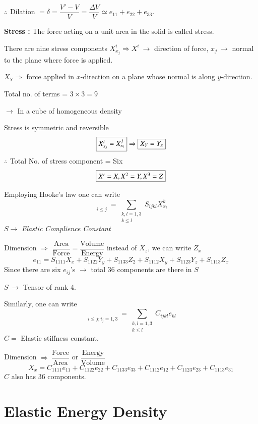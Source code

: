 $\therefore$ Dilation $=\delta=\dfrac{V'-V}{V}=\dfrac{\Delta V}{V}\simeq e_{11}+e_{22}+e_{33}$.

\eject

\noindent
{\bf Stress :} The force acting on a unit area in the solid is called stress.

There are nine stress components $X^{i}_{x_{j}}\Rightarrow X^{i} \ \to$ direction of force, $x_{j} \ \to$ normal to the plane where force is applied.

$X_{Y}\Rightarrow$ force applied in $x$-direction on a plane whose normal is along $y$-direction.

Total no. of terms = $3\times 3=9$

$\to$ In a cube of homogeneous density

Stress is symmetric and reversible
$$
\fbox{$X^{i}_{x_{j}}=X^{j}_{x_{i}}$}\Rightarrow \fbox{$X_{Y}=Y_{x}$}
$$
$\therefore$ Total No. of stress component = Six
$$
\fbox{$X'=X, X^{2}=Y, X^{3}=Z$}
$$

Employing Hooke's law one can write
$$
{\displaystyle{\mathop{e_{ij}}\limits_{i\leq j}}}=\sum\limits_{\substack{k,l=1,3\\ k\leq l}}S_{ijkl}X^{k}_{x_{l}}
$$
$S\to$ {\em Elastic Complience Constant}

Dimension $\Rightarrow$ $\dfrac{\text{Area}}{\text{Force}}=\dfrac{\text{Volume}}{\text{Energy}}$ instead of $X_{z}$, we can write $Z_{x}$
$$
e_{11}=S_{1111}X_{x}+S_{1122}Y_{y}+S_{1133}Z_{2}+S_{1112}X_{y}+S_{1123}Y_{z}+S_{1113}Z_{x}
$$
Since there are six $e_{ij}$'s $\to$ total 36 components are there in $S$

$S \ \to$ Tensor of rank 4.

Similarly, one can write
$$
{\displaystyle{\mathop{X^{i}_{x_{j}}}\limits_{i\leq j; i_{j}=1,3}}}=\sum\limits_{\substack{k,l=1,3\\ k\leq l}}C_{ijkl}e_{kl}
$$
$C=$ Elastic stiffness constant.

\medskip

Dimension $\Rightarrow \ \dfrac{\text{Force}}{\text{Area}}$ or $\dfrac{\text{Energy}}{\text{Volume}}$
$$
X_{x}=C_{1111}e_{11}+C_{1122}e_{22}+C_{1133}e_{33}+C_{1112}e_{12}+C_{1123}e_{23}+C_{1113}e_{31}
$$
$C$ also has 36 components.

\section*{Elastic Energy Density}

